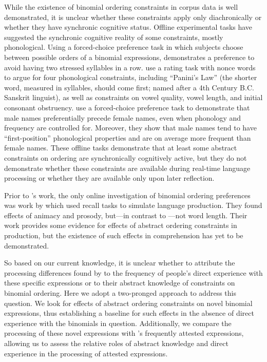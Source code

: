 \documentclass[authoryear]{elsarticle}
\begin{document}
While the existence of binomial ordering constraints in corpus data is well demonstrated, it is unclear whether these constraints apply only diachronically or whether they have synchronic cognitive status. Offline experimental tasks have suggested the synchronic cognitive reality of some constraints, mostly phonological. Using a forced-choice preference task in which subjects choose between possible orders of a binomial expressions, \citet{Bolinger:1962wc} demonstrates a preference to avoid having two stressed syllables in a row. \citet{Pinker:1979tf} use a rating task with nonce words to argue for four phonological constraints, including ``Panini's Law'' (the shorter word, measured in syllables, should come first; named after a 4th Century B.C. Sanskrit linguist), as well as constraints on vowel quality, vowel length, and initial consonant obstruency. \cite{Wright:2005tc} use a forced-choice preference task to demonstrate that male names preferentially precede female names, even when phonology and frequency are controlled for. Moreover, they show that male names tend to have ``first-position'' phonological properties and are on average more frequent than female names. These offline tasks demonstrate that at least some abstract constraints on ordering are synchronically cognitively active, but they do not demonstrate whether these constraints are available during real-time language processing or whether they are available only upon later reflection.


Prior to \citeauthor{SiyanovaChanturia:2011ep}'s work, the only online investigation of binomial ordering preferences was work by \citet{McDonald:1993wq} which used recall tasks to simulate language production. They found effects of animacy and prosody, but---in contrast to \citeauthor{Pinker:1979tf}---not word length. Their work provides some evidence for effects of abstract ordering constraints in production, but the existence of such effects in comprehension has yet to be demonstrated.

So based on our current knowledge, it is unclear whether to attribute the processing differences found by \citeauthor{SiyanovaChanturia:2011ep} to the frequency of people's direct experience with these specific expressions or to their abstract knowledge of constraints on binomial ordering. Here we adopt a two-pronged approach to address this question. We look for effects of abstract ordering constraints on novel binomial expressions, thus establishing a baseline for such effects in the absence of direct experience with the binomials in question. Additionally, we compare the processing of these novel expressions with \citeauthor{SiyanovaChanturia:2011ep}'s frequently attested expressions, allowing us to assess the relative roles of abstract knowledge and direct experience in the processing of attested expressions. 
\end{document}
